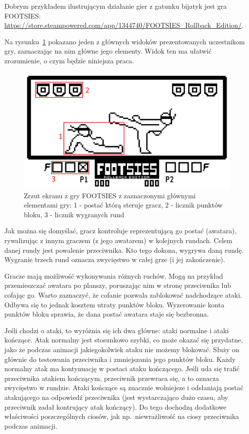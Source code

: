 Dobrym przykładem ilustrującym działanie gier z gatunku bijatyk jest gra FOOTSIES: \url{https://store.steampowered.com/app/1344740/FOOTSIES_Rollback_Edition/}. 

Na rysunku~\ref{fig:footsies} pokazano jeden z głównych widoków prezentowanych uczestnikom gry, zaznaczając na nim główne jego elementy. Widok ten ma ułatwić zrozumienie, o czym będzie niniejsza praca. 
\begin{figure}
	\centering
		\includegraphics[width=0.64\linewidth]{rys01/footsies}
	\caption{Zrzut ekranu z gry FOOTSIES z zaznaczonymi głównymi elementami gry: 1 - postać którą steruje gracz, 2 - licznik punktów bloku, 3 - licznik wygranych rund}
	\label{fig:footsies}
\end{figure}

Jak można się domyślać, gracz kontroluje reprezentującą go postać (awatara), rywalizując z innym graczem (z jego awatarem) w kolejnych rundach. Celem danej rundy jest powalenie przeciwnika. Kto tego dokona, wygrywa daną rundę. Wygranie trzech rund oznacza zwycięstwo w całej grze (i jej zakończenie).

Gracze mają możliwość wykonywania różnych ruchów. Mogą na przykład przemieszczać awatara po planszy, poruszając nim w stronę przeciwnika lub cofając go. Warto zaznaczyć, że cofanie pozwala zablokować nadchodzące ataki. Odbywa się to jednak kosztem utraty punktów bloku. Wyzerowanie konta punktów bloku sprawia, że dana postać awatara staje się bezbronna.

Jeśli chodzi o ataki, to wyróżnia się ich dwa główne: ataki normalne i ataki kończące. Atak normalny jest stosunkowo szybki, co może okazać się przydatne, jako że podczas animacji jakiegokolwiek ataku nie możemy blokować. Służy on głównie do testowania przeciwnika i zmniejszania jego punktów bloku. Każdy normalny atak ma kontynuację w postaci ataku kończącego. Jeśli uda się trafić przeciwnika atakiem kończącym, przeciwnik przewraca się, a to oznacza zwycięstwo w rundzie. Ataki kończące są znacznie wolniejsze i odsłaniają postać atakującego na odpowiedź przeciwnika (jest wystarczająco dużo czasu, aby przeciwnik zadał kontrujący atak kończący). Do tego dochodzą dodatkowe właściwości poszczególnych ciosów, jak np.\ niewrażliwość na ciosy przeciwnika podczas animacji.


